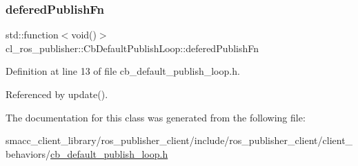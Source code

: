 \subsubsection{\texorpdfstring{defered\+Publish\+Fn}{deferedPublishFn}}
{\footnotesize\ttfamily std\+::function$<$void()$>$ cl\+\_\+ros\+\_\+publisher\+::\+Cb\+Default\+Publish\+Loop\+::defered\+Publish\+Fn\hspace{0.3cm}{\ttfamily [private]}}



Definition at line 13 of file cb\+\_\+default\+\_\+publish\+\_\+loop.\+h.



Referenced by update().



The documentation for this class was generated from the following file\+:\begin{DoxyCompactItemize}
\item 
smacc\+\_\+client\+\_\+library/ros\+\_\+publisher\+\_\+client/include/ros\+\_\+publisher\+\_\+client/client\+\_\+behaviors/\hyperlink{cb__default__publish__loop_8h}{cb\+\_\+default\+\_\+publish\+\_\+loop.\+h}\end{DoxyCompactItemize}
